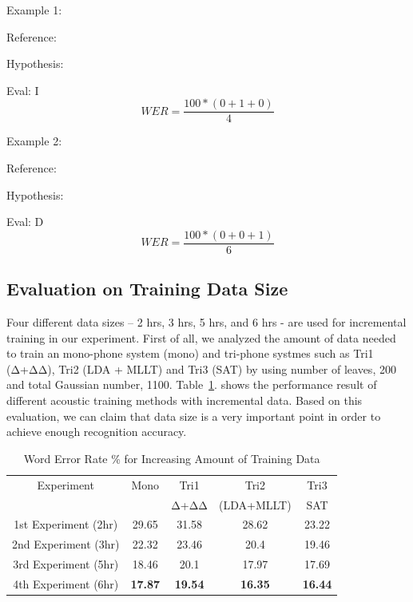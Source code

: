 \documentclass[conference]{IEEEtran}
\newcommand\tab[1][1cm]{\hspace*{#1}}
\begin{document}
Example 1:

\tab Reference:  \tab{\padauktext စဉ်းစား ပေး ပါ  **   ရှင်}

\tab Hypothesis:  \tab{\padauktext စဉ်းစား ပေး ပါ တယ် ရှင်}

\tab Eval:	\tab[4.4cm]I	
\begin{equation*}
 WER = 
  \frac{100*(0+1+0)}{4}
\end{equation*}

Example 2:

\tab Reference:  \tab{\padauktext ကား ရဲ့ အရှိန် ကို လျှော့ ပါ}

\tab Hypothesis:  \tab{\padauktext ကား ရဲ့ အရှိန် **  လျှော့ ပါ }

\tab Eval:	\tab[4cm]D	
\begin{equation*}
 WER = 
  \frac{100*(0+0+1)}{6}
\end{equation*}

\subsection{Evaluation on Training Data Size}
\label{sec:EvaluationTraining}
Four different data sizes – 2 hrs, 3 hrs, 5 hrs, and 6 hrs - are used for incremental training in our experiment. First of all, we analyzed the amount of data needed to train an mono-phone system (mono) and tri-phone systmes such as Tri1 (Δ+ΔΔ), Tri2 (LDA + MLLT) and Tri3 (SAT) by using number of leaves, 200 and total Gaussian number, 1100. Table~\ref{table:exp1Data}. shows the performance result of different acoustic training methods with incremental data. Based on this evaluation, we can claim that data size is a very important point in order to achieve enough recognition accuracy. 
\begin{table}[ht]
\caption{Word Error Rate \%  for Increasing Amount of Training Data} %
\centering %
\setlength\tabcolsep{1.5pt} %
\begin{tabular}{c c c c c} %
\hline %
Experiment & Mono & Tri1 & Tri2 & Tri3 \\  %
  &  & Δ+ΔΔ & (LDA+MLLT) & SAT  \\
\hline %
1st Experiment (2hr) &  29.65 & 31.58 & 28.62 & 23.22\\
2nd Experiment (3hr) &  22.32 & 23.46 & 20.4 & 19.46\\
3rd Experiment (5hr) &  18.46 & 20.1 & 17.97 & 17.69\\
4th Experiment (6hr) &  \textbf{17.87}  & \textbf{19.54} & \textbf{16.35} & \textbf{16.44}\\[1ex] %
\hline %
\end{tabular}
\label{table:exp1Data} %
\end{table}
\end{document}
